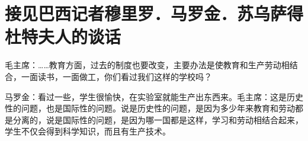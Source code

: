 \section[接见巴西记者穆里罗．马罗金．苏乌萨得杜特夫人的谈话（一九五八年九月二日）]{接见巴西记者穆里罗．马罗金．苏乌萨得杜特夫人的谈话}


毛主席：……教育方面，过去的制度也要改变，主要办法是使教育和生产劳动相结合，一面读书，一面做工，你们看过我们这样的学校吗？

马罗金：看过一些，学生很愉快，在实验室就能生产出东西来。毛主席：这是历史性的问题，也是国际性的问题。说是历史性的问题，是因为多少年来教育和劳动都是分离的，说是国际性的问题，是因为哪一国都是这样，学习和劳动相结合起来，学生不仅会得到科学知识，而且有生产技术。


